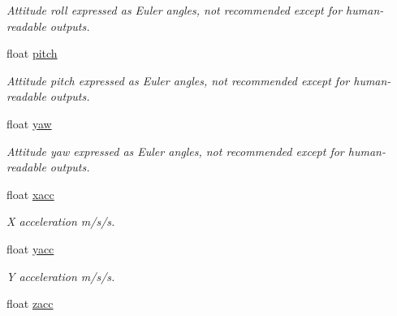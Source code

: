 \begin{DoxyCompactItemize}
\begin{DoxyCompactList}\small\item\em Attitude roll expressed as Euler angles, not recommended except for human-\/readable outputs. \end{DoxyCompactList}\item 
\hypertarget{struct____mavlink__sim__state__t_acec861e9f5f2b6f85150a4c588abcf84}{float \hyperlink{struct____mavlink__sim__state__t_acec861e9f5f2b6f85150a4c588abcf84}{pitch}}\label{struct____mavlink__sim__state__t_acec861e9f5f2b6f85150a4c588abcf84}

\begin{DoxyCompactList}\small\item\em Attitude pitch expressed as Euler angles, not recommended except for human-\/readable outputs. \end{DoxyCompactList}\item 
\hypertarget{struct____mavlink__sim__state__t_afeb19c5418ee1b9b5c85d023b6cfc0df}{float \hyperlink{struct____mavlink__sim__state__t_afeb19c5418ee1b9b5c85d023b6cfc0df}{yaw}}\label{struct____mavlink__sim__state__t_afeb19c5418ee1b9b5c85d023b6cfc0df}

\begin{DoxyCompactList}\small\item\em Attitude yaw expressed as Euler angles, not recommended except for human-\/readable outputs. \end{DoxyCompactList}\item 
\hypertarget{struct____mavlink__sim__state__t_a9d04a947d145cbdbf3bfc5ca28f65057}{float \hyperlink{struct____mavlink__sim__state__t_a9d04a947d145cbdbf3bfc5ca28f65057}{xacc}}\label{struct____mavlink__sim__state__t_a9d04a947d145cbdbf3bfc5ca28f65057}

\begin{DoxyCompactList}\small\item\em X acceleration m/s/s. \end{DoxyCompactList}\item 
\hypertarget{struct____mavlink__sim__state__t_aff549378ca9cd4eb5b79a591b40e5dfe}{float \hyperlink{struct____mavlink__sim__state__t_aff549378ca9cd4eb5b79a591b40e5dfe}{yacc}}\label{struct____mavlink__sim__state__t_aff549378ca9cd4eb5b79a591b40e5dfe}

\begin{DoxyCompactList}\small\item\em Y acceleration m/s/s. \end{DoxyCompactList}\item 
\hypertarget{struct____mavlink__sim__state__t_a9205c7cddd37f729f68695bcbec647f9}{float \hyperlink{struct____mavlink__sim__state__t_a9205c7cddd37f729f68695bcbec647f9}{zacc}}\label{struct____mavlink__sim__state__t_a9205c7cddd37f729f68695bcbec647f9}


\end{DoxyCompactItemize}
